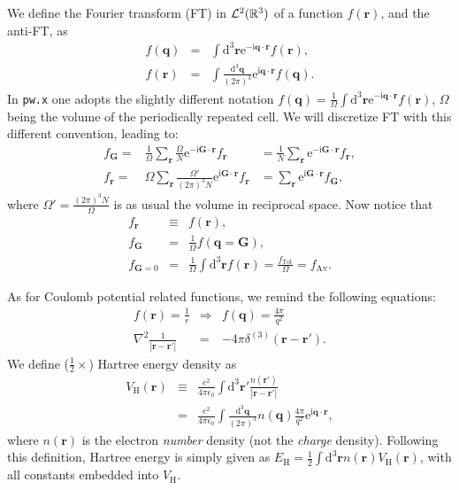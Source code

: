 \documentclass[a4paper,twocolumn,12pt]{article}
\newcommand{\var}[1]{{\tt #1}}
\begin{document}
We define the Fourier transform (FT) in ${\cal{L}}^{2}(\mathbb{R}^3)$
of a function $f(\mathbf{r})$, and the anti-FT, as
\begin{eqnarray}
\label{eq:FTL2R3}
f(\mathbf{q}) &=& \int \mathrm{d}^3 \mathbf{r} \mathrm{e}^{ -\mathrm{i} \mathbf{q} \cdot \mathbf{r}} f(\mathbf{r}),\\
f(\mathbf{r}) &=& \int \frac{\mathrm{d}^3 \mathbf{q}}{(2\pi)^3} \mathrm{e}^{ \mathrm{i} \mathbf{q} \cdot \mathbf{r}} f(\mathbf{q}).
\end{eqnarray}
In \var{pw.x} one adopts the slightly different notation
$f(\mathbf{q})=\frac{1}{\Omega} \int \mathrm{d}^3 \mathbf{r}
\mathrm{e}^ { -\mathrm{i} \mathbf{q} \cdot \mathbf{r}} f(\mathbf{r})$,
$\Omega$ being the volume of the periodically repeated cell.
We will discretize FT with this different convention, leading to:
\begin{eqnarray}
\label{eq:discFT}f_\mathbf{G}=&\frac{1}{\Omega} \sum_\mathbf{r} \frac{\Omega}{N} \mathrm{e}^ { -\mathrm{i} \mathbf{G} \cdot \mathbf{r}} f_\mathbf{r}& =\frac{1}{N} \sum_\mathbf{r} \mathrm{e}^ { -\mathrm{i} \mathbf{G} \cdot \mathbf{r}} f_\mathbf{r},\\
f_\mathbf{r}=&{\Omega} \sum_\mathbf{r} \frac{\Omega'}{(2\pi)^3N} \mathrm{e}^ { \mathrm{i} \mathbf{G} \cdot \mathbf{r}} f_\mathbf{r}& = \sum_\mathbf{r} \mathrm{e}^ { \mathrm{i} \mathbf{G} \cdot \mathbf{r}} f_\mathbf{G},
\end{eqnarray}
where $\Omega'=\frac{(2\pi)^3N}{\Omega}$ is as usual the volume in
reciprocal space.  Now notice that
\begin{eqnarray}
f_\mathbf{r} &\equiv& f(\mathbf{r}),\\
f_\mathbf{G} &=& \frac{1}{\Omega} f(\mathbf{q}=\mathbf{G}),\\
f_{\mathbf{G}=0} &=& \frac{1}{\Omega} \int \mathrm{d}^3\mathbf{r} f(\mathbf{r})= \frac{f_\text{Tot}}{\Omega}=f_\text{Av}.
\end{eqnarray}

As for Coulomb potential related functions, we remind the following equations:
\begin{eqnarray}
f(\mathbf{r})=\frac{1}{r}&\Rightarrow& f(\mathbf{q})=\frac{4\pi}{q^2}\\
\nabla^2\frac{1}{|\mathbf{r}-\mathbf{r}'|}&=&-4\pi\delta^{(3)}(\mathbf{r}-\mathbf{r}').
\end{eqnarray}
We define ($\frac{1}{2}\times$) Hartree energy density as
\begin{eqnarray}
V_\text{H}(\mathbf{r})&\equiv&\frac{e^2}{4\pi\epsilon_0} \int \mathrm{d}^3\mathbf{r}' \frac{n(\mathbf{r}')}{|\mathbf{r}-\mathbf{r}'|}\nonumber\\
\label{eq:VHcont}&=& \frac{e^2}{4\pi\epsilon_0} \int \frac{\mathrm{d}^3\mathbf{q}}{(2\pi)^3} n(\mathbf{q}) \frac{4\pi}{q^2} \mathrm{e}^{ \mathrm{i} \mathbf{q} \cdot \mathbf{r}},
\end{eqnarray}
where $n(\mathbf{r})$ is the electron {\em number} density (not the
{\em charge} density).  Following this definition, Hartree energy is
simply given as $E_\text{H}=\frac{1}{2} \int \mathrm{d}^3\mathbf{r}
n(\mathbf{r}) V_\text{H}(\mathbf{r})$, with all constants embedded
into $V_\text{H}$.
\end{document}
